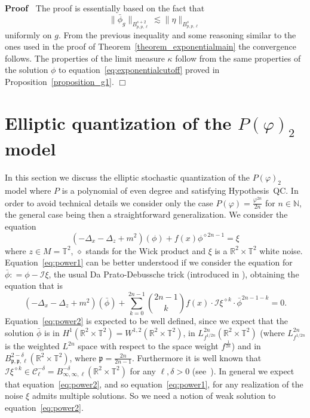 \documentclass[a4paper,10pt]{article}
\newenvironment{proof}{\noindent\textbf{Proof\ }}{\hspace*{\fill}$\Box$\medskip}
\begin{document}
\begin{proof}
  The proof is essentially based on the fact that
  \[ \| \bar{\phi}_g \|_{B^{s + 2}_{p, p, \ell}} \lesssim \| \eta \|_{B^s_{p,
     p, \ell}} \]
  uniformly on $g$. From the previous inequality and some reasoning similar to
  the ones used in the proof of Theorem~\ref{theorem_exponentialmain} the
  convergence follows. The properties of the limit measure $\kappa$ follow
  from the same properties of the solution $\phi$ to
  equation~{\eqref{eq:exponentialcutoff}} proved in
  Proposition~\ref{proposition_g1}.
\end{proof}

\section{Elliptic quantization of the $P (\varphi)_2$
model}\label{section_power}

In this section we discuss the elliptic stochastic quantization of the $P
(\varphi)_2$ model where $P$ is a polynomial of even degree and satisfying
Hypothesis~QC. In order to avoid technical details we consider only the case
$P (\varphi) = \frac{\varphi^{2 n}}{2 n}$ for $n \in \mathbb{N}$, the general
case being then a straightforward generalization. We consider the equation
\begin{equation}
  (- \Delta_x - \Delta_z + m^2) (\phi) + f (x) \phi^{\diamond 2 n - 1} = \xi
  \label{eq:power1}
\end{equation}
where $z \in M =\mathbb{T}^2$, $\diamond$ stands for the Wick product and
$\xi$ is a $\mathbb{R}^2 \times \mathbb{T}^2$ white noise.
Equation~{\eqref{eq:power1}} can be better understood if we consider the
equation for $\bar{\phi} : = \phi - \mathcal{I} \xi$, the usual Da
Prato-Debussche trick (introduced in {\cite{da_prato_strong_2003}}), obtaining
the equation that is
\begin{equation}
  (- \Delta_x - \Delta_z + m^2) (\bar{\phi}) + \sum_{k = 0}^{2 n - 1} \binom{2
  n - 1}{k} f (x) \cdot \mathcal{I} \xi^{\diamond k} \cdot \bar{\phi}^{2 n - 1
  - k} = 0. \label{eq:power2}
\end{equation}
Equation~{\eqref{eq:power2}} is expected to be well defined, since we expect
that the solution $\bar{\phi}$ is in $H^1 (\mathbb{R}^2 \times \mathbb{T}^2) =
W^{1, 2} (\mathbb{R}^2 \times \mathbb{T}^2)$, in $L^{2 n}_{f^{1 / 2 n}}
(\mathbb{R}^2 \times \mathbb{T}^2)$ (where $L^{2 n}_{f^{1 / 2 n}}$ is the
weighted $L^{2 n}$ space with respect to the space weight $f^{\frac{1}{2 n}}$)
and in $B^{2 - \delta}_{\mathfrak{p}, \mathfrak{p}, \ell} (\mathbb{R}^2 \times
\mathbb{T}^2)$, where $\mathfrak{p =} \frac{2 n}{2 n - 1}$. Furthermore it is
well known that $\mathcal{I} \xi^{\diamond k} \in \mathcal{C}^{-
\delta}_{\ell} = B^{- \delta}_{\infty, \infty, \ell} (\mathbb{R}^2 \times
\mathbb{T}^2)$ for any $\ell, \delta > 0$ (see~{\cite{GH18}}). In general we
expect that equation~{\eqref{eq:power2}}, and so equation~{\eqref{eq:power1}},
for any realization of the noise $\xi$ admits multiple solutions. So we need a
notion of weak solution to equation~{\eqref{eq:power2}}.
\end{document}
